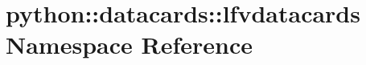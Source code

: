 \hypertarget{namespacepython_1_1datacards_1_1lfvdatacards}{
\section{python::datacards::lfvdatacards Namespace Reference}
\label{namespacepython_1_1datacards_1_1lfvdatacards}
}
